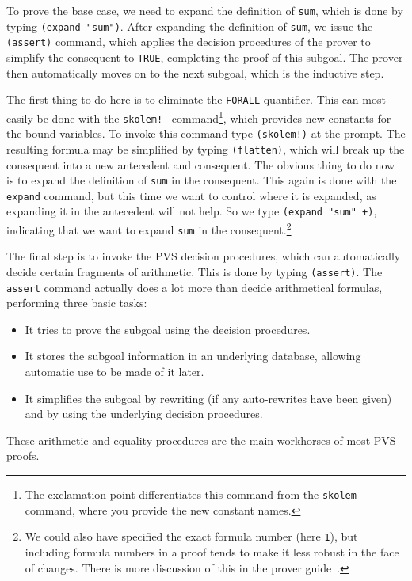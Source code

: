 To prove the base case, we need to expand the definition of \texttt{sum},
which is done by typing \texttt{(expand "sum")}.  After expanding the definition of
\texttt{sum}, we issue the \texttt{(assert)} command, which applies the decision
procedures of the prover to simplify the consequent to \texttt{TRUE},
completing the proof of this subgoal.  The prover then automatically moves
on to the next subgoal, which is the inductive step.

The first thing to do here is to eliminate the \texttt{FORALL} quantifier.
This can most easily be done with the \texttt{skolem!}\   command\footnote{The exclamation point
differentiates this command from the \texttt{skolem} command, where you
provide the new constant names.}, which provides new constants for the
bound variables.  To invoke this command type \texttt{(skolem!)} at the
prompt.  The resulting formula may be simplified by typing
\texttt{(flatten)}, which
will break up the consequent into a new antecedent and consequent.  The
obvious thing to do now is to expand the definition of \texttt{sum} in the
consequent.  This again is done with the \texttt{expand} command, but this
time we want to control where it is expanded, as expanding it in the
antecedent will not help.  So we type \texttt{(expand "sum" +)},
indicating that we want to expand \texttt{sum} in the
consequent.\footnote{We could also have specified the exact formula number
(here \texttt{1}), but including formula numbers in a proof tends to make
it less robust in the face of changes.  There is more discussion of this
in the prover guide~\cite{PVS:prover}.}

The final step is to invoke the PVS decision procedures, which can
automatically decide certain fragments of arithmetic.  This is done by
typing \texttt{(assert)}. The \texttt{assert} command actually does a lot more than
decide arithmetical formulas, performing three basic tasks:
\begin{itemize}\def\itemsep{0in}
\item It tries to prove the subgoal using the decision procedures.

\item It stores the subgoal information in an underlying database,
allowing automatic use to be made of it later.

\item It simplifies the subgoal by rewriting (if any auto-rewrites have
been given) and by using the underlying decision procedures.
\end{itemize}
These arithmetic and equality procedures are the main workhorses of most
PVS proofs.

